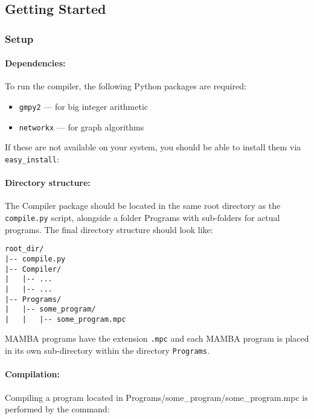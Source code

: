 
\subsection{Getting Started}

\subsubsection{Setup}

\paragraph{Dependencies:}

To run the compiler, the following Python packages are required:
\begin{itemize}
\item \texttt{gmpy2} --- for big integer arithmetic
\item \texttt{networkx} --- for graph algorithms
\end{itemize}
If these are not available on your system, you should be able to install them
via \texttt{easy\_install}:


\paragraph{Directory structure:}

The Compiler package should be located in the same root directory as the
\texttt{compile.py} script, alongside a folder Programs with sub-folders for
actual programs. The final directory structure should look like:

\begin{lstlisting}[language={}]
root_dir/
|-- compile.py
|-- Compiler/
|   |-- ...
|   |-- ...
|-- Programs/
|   |-- some_program/
|   |   |-- some_program.mpc
\end{lstlisting}
MAMBA programs have the extension \verb+.mpc+ and each MAMBA
program is placed in its own sub-directory within
the directory \verb+Programs+.

\paragraph{Compilation:}

Compiling a program located in Programs/some\_program/some\_program.mpc is performed by the
command:

